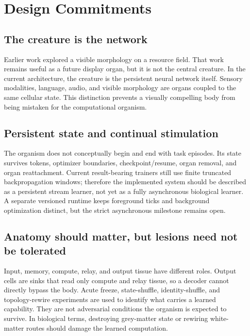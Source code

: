 \documentclass[11pt]{article}
\begin{document}
\section{Design Commitments}

\subsection{The creature is the network}

Earlier work explored a visible morphology on a resource field. That work remains
useful as a future display organ, but it is not the central creature. In the current
architecture, the creature is the persistent neural network itself. Sensory modalities,
language, audio, and visible morphology are organs coupled to the same cellular state.
This distinction prevents a visually compelling body from being mistaken for the
computational organism.

\subsection{Persistent state and continual stimulation}

The organism does not conceptually begin and end with task episodes. Its state survives
tokens, optimizer boundaries, checkpoint/resume, organ removal, and organ reattachment.
Current result-bearing trainers still use finite truncated backpropagation windows;
therefore the implemented system should be described as a persistent stream learner,
not yet as a fully asynchronous biological learner. A separate versioned runtime keeps
foreground ticks and background optimization distinct, but the strict asynchronous
milestone remains open.

\subsection{Anatomy should matter, but lesions need not be tolerated}

Input, memory, compute, relay, and output tissue have different roles. Output cells are
sinks that read only compute and relay tissue, so a decoder cannot directly bypass the
body. Acute freeze, state-shuffle, identity-shuffle, and topology-rewire experiments are
used to identify what carries a learned capability. They are not adversarial conditions
the organism is expected to survive. In biological terms, destroying grey-matter state
or rewiring white-matter routes should damage the learned computation.
\end{document}
